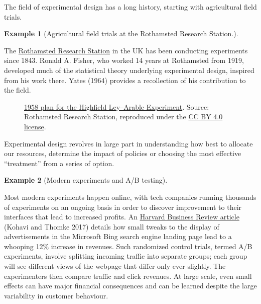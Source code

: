 \documentclass[
  11pt,
  letterpaper,
]{scrbook}
\theoremstyle{definition}
\theoremstyle{definition}
\newtheorem{example}{Example}[chapter]
\theoremstyle{remark}
\begin{document}
The field of experimental design has a long history, starting with
agricultural field trials.

\begin{example}[Agricultural field trials at the Rothamsted Research
Station.]\protect\hypertarget{exm-agriculturalfieldtrials}{}\label{exm-agriculturalfieldtrials}

The \href{https://www.rothamsted.ac.uk/}{Rothamsted Research Station} in
the UK has been conducting experiments since 1843. Ronald A. Fisher, who
worked 14 years at Rothamsted from 1919, developed much of the
statistical theory underlying experimental design, inspired from his
work there. Yates (1964) provides a recollection of his contribution to
the field.

\begin{figure}[ht!]


\caption{\label{fig-rothamsted}\href{http://www.era.rothamsted.ac.uk/eradoc/article/PS-Highfield-Ley-Arable-1-1}{1958
plan for the Highfield Ley--Arable Experiment}. Source: Rothamsted
Research Station, reproduced under the
\href{https://creativecommons.org/licenses/by/4.0/}{CC BY 4.0 license}.}

\end{figure}%

\end{example}

Experimental design revolves in large part in understanding how best to
allocate our resources, determine the impact of policies or choosing the
most effective ``treatment'' from a series of option.

\begin{example}[Modern experiments and A/B
testing]\protect\hypertarget{exm-experimentalexample1}{}\label{exm-experimentalexample1}

Most modern experiments happen online, with tech companies running
thousands of experiments on an ongoing basis in order to discover
improvement to their interfaces that lead to increased profits. An
\href{https://hbr.org/2017/09/the-surprising-power-of-online-experiments}{Harvard
Business Review article} (Kohavi and Thomke 2017) details how small
tweaks to the display of advertisements in the Microsoft Bing search
engine landing page lead to a whooping 12\% increase in revenues. Such
randomized control trials, termed A/B experiments, involve splitting
incoming traffic into separate groups; each group will see different
views of the webpage that differ only ever slightly. The experimenters
then compare traffic and click revenues. At large scale, even small
effects can have major financial consequences and can be learned despite
the large variability in customer behaviour.

\end{example}
\end{document}
